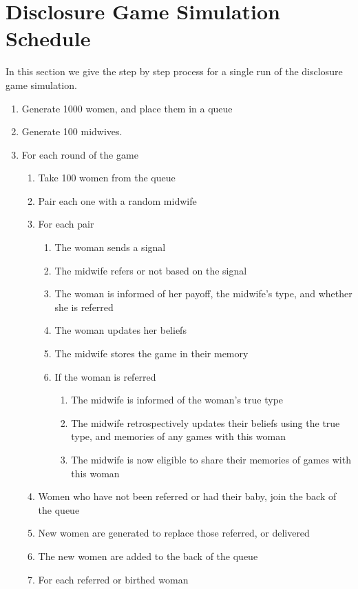 
\chapter{Disclosure Game Simulation Schedule}
\label{app:sim_schedule}

In this section we give the step by step process for a single run of the disclosure game simulation.

\begin{enumerate}
\item Generate 1000 women, and place them in a queue
\item Generate 100 midwives.
\item For each round of the game
\begin{enumerate}
	\item Take 100 women from the queue
	\item Pair each one with a random midwife
	\item For each pair
	\begin{enumerate}
		\item The woman sends a signal
		\item The midwife refers or not based on the signal
		\item The woman is informed of her payoff, the midwife's type, and whether she is referred
		\item The woman updates her beliefs
		\item The midwife stores the game in their memory
		\item If the woman is referred
		\begin{enumerate}
			\item The midwife is informed of the woman's true type
			\item The midwife retrospectively updates their beliefs using the true type, and memories of any games with this woman
			\item The midwife is now eligible to share their memories of games with this woman
		\end{enumerate}
	\end{enumerate}
	\item Women who have not been referred or had their baby, join the back of the queue
	\item New women are generated to replace those referred, or delivered
	\item The new women are added to the back of the queue
	\item For each referred or birthed woman

\end{enumerate}
\end{enumerate}
